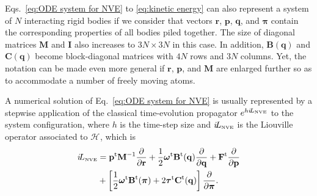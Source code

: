 \documentclass[
journal=jctcce,
layout=twocolumn
]{achemso}
\newcommand{\mt}[1]{\boldsymbol{\mathbf{#1}}}   %
\newcommand{\vt}[1]{\boldsymbol{\mathbf{#1}}}   %
\newcommand{\tr}[1]{#1^\text{t}}                %
\newcommand{\diff}[2]{\frac{\partial #1}{\partial #2}} %
\newcommand{\Ham}[1]{{\mathcal H}_\text{#1}}    %
\newcommand{\Liu}[1]{i\!L_\text{#1}}            %
\newcommand{\timestep}{h}
\begin{document}
Eqs.~\eqref{eq:ODE system for NVE} to \eqref{eq:kinetic energy} can also represent a system of $N$ interacting rigid bodies if we consider that vectors $\vt r$, $\vt p$, $\vt q$, and $\vt \pi$ contain the corresponding properties of all bodies piled together.
The size of diagonal matrices $\mt M$ and $\mt I$ also increases to $3N \times 3N$ in this case.
In addition, $\mt B(\vt q)$ and $\mt C(\vt q)$ become block-diagonal matrices with $4N$ rows and $3N$ columns.
Yet, the notation can be made even more general if $\vt r$, $\vt p$, and $\mt M$ are enlarged further so as to accommodate a number of freely moving atoms.

A numerical solution of Eq.~\eqref{eq:ODE system for NVE} is usually represented by a stepwise application of the classical time-evolution propagator \cite{Tuckerman_2010} $e^{\timestep \Liu{\tiny NVE}}$ to the system configuration, where $\timestep$ is the time-step size and $\Liu{\tiny NVE}$ is the Liouville operator associated to $\Ham{}$, which is
\begin{equation}
\label{eq:Lioville operator}
\begin{split}
\Liu{\tiny NVE} &= \tr{\vt p} {\mt M}^{-1} \diff{}{\vt r} + \frac{1}{2} \tr{\vt \omega} \tr{\mt B}(\vt q) \diff{}{\vt q} + \tr{\vt F} \diff{}{\vt p} \\
&+ \left[ \frac{1}{2} \tr{\vt \omega} \tr{\mt B}(\vt \pi) + 2 \tr{\vt \tau} \tr{\mt C}(\vt q) \right] \diff{}{\vt \pi}.
\end{split}
\end{equation}
\end{document}

